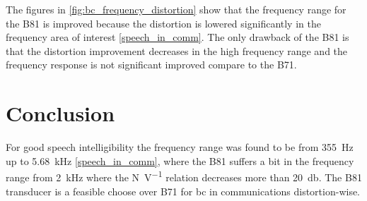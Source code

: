 The figures in \autoref{fig:bc_frequency_distortion} show that the frequency range for the B81 is improved because the distortion is lowered significantly in the frequency area of interest \autoref{speech_in_comm}. The only drawback of the B81 is that the distortion improvement decreases in the high frequency range and the frequency response is not significant improved compare to the B71. 


\section{Conclusion}

For good speech intelligibility the frequency range was found to be from \SI{355}{\hertz} up to \SI{5.68}{\kilo\hertz}  \autoref{speech_in_comm}, where the B81 suffers a bit in the frequency range from \SI{2}{\kilo\hertz} where the \si{\newton\per\volt} relation decreases more than \SI{20}{\decibel}.  The B81 transducer is a feasible choose over B71 for \gls{bc} in communications distortion-wise.







